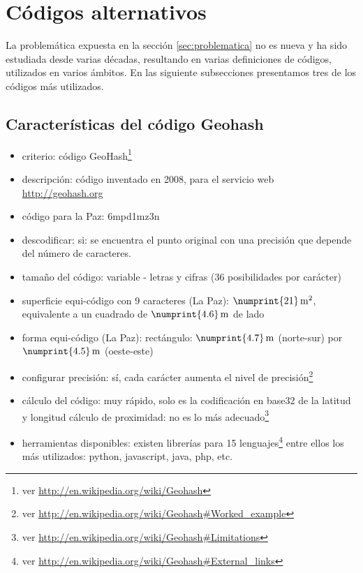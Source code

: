 \documentclass[letterpaper]{article}
\begin{document}
\section{Códigos alternativos}

La problemática expuesta en la sección \ref{sec:problematica} no es 
nueva y ha sido estudiada desde varias décadas, resultando en varias 
definiciones de códigos, utilizados en varios ámbitos. En las
siguiente subsecciones presentamos tres de los códigos más 
utilizados.

\subsection{Características del código Geohash}

\begin{itemize}
	\item criterio: código GeoHash\footnote{ver \url{http://en.wikipedia.org/wiki/Geohash}}
	\item descripción: código inventado en 2008, para el servicio web \url{http://geohash.org}
	\item código para la Paz: 6mpd1mz3n 
	\item descodificar: si: se encuentra el punto original con una 
		precisión que depende del número de caracteres. 
	\item tamaño del código: variable - letras y cifras (36 
		posibilidades por carácter) 
	\item superficie equi-código con 9 caracteres (La Paz): 
		\(\numprint{21}\,\mathrm{m^{2}}\), 
		equivalente a un cuadrado de \(\numprint{4.6}\,\mathrm{m}\) de lado 
	\item forma equi-código (La Paz): rectángulo: 
		\(\numprint{4.7}\,\mathrm{m}\) (norte-sur) por 
		\(\numprint{4.5}\,\mathrm{m}\) (oeste-este) 
	\item configurar precisión: sí, cada 
		carácter aumenta el nivel de precisión\footnote{ver 
		\url{http://en.wikipedia.org/wiki/Geohash\#Worked_example}} 
	\item cálculo del código: muy rápido, solo es la codificación en
		base32 de la latitud y longitud 
		cálculo de proximidad: no es lo más adecuado\footnote{ver 
		\url{http://en.wikipedia.org/wiki/Geohash\#Limitations}} 
	\item herramientas disponibles: existen librerías para 15 lenguajes\footnote{ver 
		\url{http://en.wikipedia.org/wiki/Geohash\#External_links}}
		entre ellos los más utilizados: python, javascript, java, php,
		etc.
\end{itemize}
\end{document}
